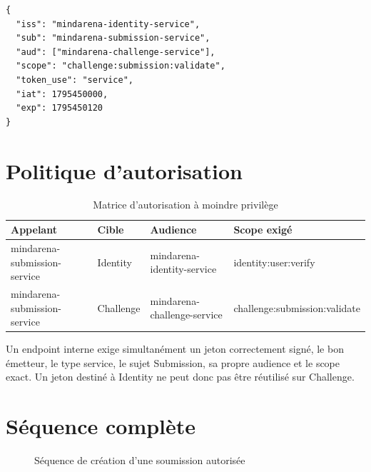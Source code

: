 \documentclass[12pt,a4paper,oneside]{report}
\begin{document}
\begin{lstlisting}[caption={Exemple conceptuel de claims pour Challenge},label={lst:claims}]
{
  "iss": "mindarena-identity-service",
  "sub": "mindarena-submission-service",
  "aud": ["mindarena-challenge-service"],
  "scope": "challenge:submission:validate",
  "token_use": "service",
  "iat": 1795450000,
  "exp": 1795450120
}
\end{lstlisting}

\section{Politique d'autorisation}
\begin{table}[H]
\centering
\caption{Matrice d'autorisation à moindre privilège}
\label{tab:policy}
\begin{tabularx}{\textwidth}{P{3.1cm}P{2.2cm}P{4.2cm}Y}
\toprule
\textbf{Appelant} & \textbf{Cible} & \textbf{Audience} & \textbf{Scope exigé} \\
\midrule
mindarena-submission-service & Identity & mindarena-identity-service & identity:user:verify \\
mindarena-submission-service & Challenge & mindarena-challenge-service & challenge:submission:validate \\
\bottomrule
\end{tabularx}
\end{table}

Un endpoint interne exige simultanément un jeton correctement signé, le bon
émetteur, le type service, le sujet Submission, sa propre audience et le scope
exact. Un jeton destiné à Identity ne peut donc pas être réutilisé sur Challenge.

\section{Séquence complète}
\begin{figure}[H]
\centering
{}
\caption{Séquence de création d'une soumission autorisée}
\label{fig:sequence}
\end{figure}
\end{document}
